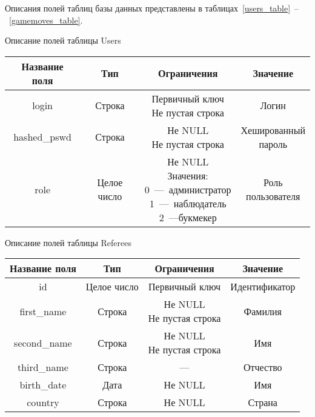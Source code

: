 Описания полей таблиц базы данных представлены в таблицах~\ref{users_table}~--~\ref{gamemoves_table}.
\begin{center}
	\begin{threeparttable}
		\captionsetup{justification=raggedright,singlelinecheck=off}
		\caption{\label{users_table}Описание полей таблицы Users}
		\centering
		\begin{tabular}{|c|c|c|c|}
			\hline
			Название поля & Тип & Ограничения & Значение \\
			\hline
			login & Строка & \specialcell{Первичный ключ\\Не пустая строка} & Логин \\
			\hline
			hashed\_pswd & Строка & \specialcell{Не NULL\\Не пустая строка} & \specialcell{Хешированный\\пароль} \\
			\hline
			role & Целое число & \specialcell{Не NULL\\Значения:\\0~---~администратор\\1~---~наблюдатель\\2~---букмекер} & \specialcell{Роль\\пользователя} \\
			\hline
		\end{tabular}
	\end{threeparttable}
\end{center}
\begin{center}
	\begin{threeparttable}
		\captionsetup{justification=raggedright,singlelinecheck=off}
		\caption{\label{referees_table}Описание полей таблицы Referees}
		\centering
		\begin{tabular}{|c|c|c|c|}
			\hline
			Название поля & Тип & Ограничения & Значение \\
			\hline
			id & Целое число & Первичный ключ & Идентификатор \\
			\hline
			first\_name & Строка & \specialcell{Не NULL\\Не пустая строка} & Фамилия \\
			\hline
			second\_name & Строка & \specialcell{Не NULL\\Не пустая строка} & Имя \\
			\hline
			third\_name & Строка & --- & Отчество \\
			\hline
			birth\_date & Дата & Не NULL & Имя \\
			\hline
			country & Строка & Не NULL & Страна \\
			\hline
		\end{tabular}
	\end{threeparttable}
\end{center}
